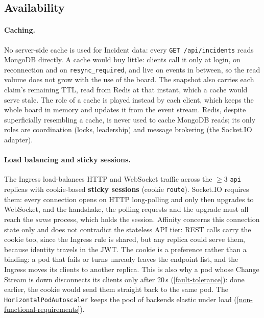 \documentclass{scrartcl}
\begin{document}
\subsection{Availability}\label{availability}
 
\paragraph{Caching.} No server-side cache is used for Incident data: every \texttt{GET /api/incidents} reads MongoDB directly. A cache would buy little: clients call it only at login, on reconnection and on \texttt{resync\_required}, and live on events in between, so the read volume does not grow with the use of the board. The snapshot also carries each claim's remaining TTL, read from Redis at that instant, which a cache would serve stale. The role of a cache is played instead by each client, which keeps the whole board in memory and updates it from the event stream. Redis, despite superficially resembling a cache, is never used to cache MongoDB reads; its only roles are coordination (locks, leadership) and message brokering (the Socket.IO adapter).
 
\paragraph{Load balancing and sticky sessions.} The Ingress load-balances HTTP and WebSocket traffic across the $\geq 3$ \texttt{api} replicas with cookie-based \textbf{sticky sessions} (cookie \texttt{route}). Socket.IO requires them: every connection opens on HTTP long-polling and only then upgrades to WebSocket, and the handshake, the polling requests and the upgrade must all reach the \emph{same} process, which holds the session. Affinity concerns this connection state only and does not contradict the stateless API tier: REST calls carry the cookie too, since the Ingress rule is shared, but any replica could serve them, because identity travels in the JWT. The cookie is a preference rather than a binding: a pod that fails or turns unready leaves the endpoint list, and the Ingress moves its clients to another replica. This is also why a pod whose Change Stream is down disconnects its clients only after 20\,s (\cref{fault-tolerance}): done earlier, the cookie would send them straight back to the same pod. The \texttt{HorizontalPodAutoscaler} keeps the pool of backends elastic under load (\cref{non-functional-requirements}).
 
\end{document}
